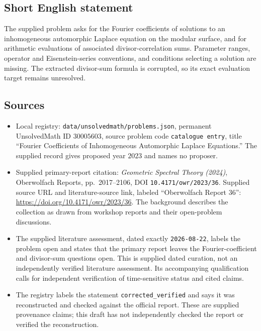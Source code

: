 \documentclass[11pt]{article}
\begin{document}
\subsection{Short English statement}
The supplied problem asks for the Fourier coefficients of solutions to an inhomogeneous automorphic Laplace equation on the modular surface, and for arithmetic evaluations of associated divisor-correlation sums. Parameter ranges, operator and Eisenstein-series conventions, and conditions selecting a solution are missing. The extracted divisor-sum formula is corrupted, so its exact evaluation target remains unresolved.
\subsection{Sources}
\begin{itemize}
\item Local registry: \texttt{data/unsolvedmath/problems.json}, permanent UnsolvedMath ID \(30005603\), source problem code \texttt{catalogue entry}, title ``Fourier Coefficients of Inhomogeneous Automorphic Laplace Equations.'' The supplied record gives proposed year \(2023\) and names no proposer.
\item Supplied primary-report citation: \emph{Geometric Spectral Theory (2024)}, Oberwolfach Reports, pp.~2017--2106, DOI \texttt{10.4171/owr/2023/36}. Supplied source URL and literature-source link, labeled ``Oberwolfach Report 36'': \url{https://doi.org/10.4171/owr/2023/36}. The background describes the collection as drawn from workshop reports and their open-problem discussions.
\item The supplied literature assessment, dated exactly \texttt{2026-08-22}, labels the problem open and states that the primary report leaves the Fourier-coefficient and divisor-sum questions open. This is supplied dated curation, not an independently verified literature assessment. Its accompanying qualification calls for independent verification of time-sensitive status and cited claims.
\item The registry labels the statement \texttt{corrected\_verified} and says it was reconstructed and checked against the official report. These are supplied provenance claims; this draft has not independently checked the report or verified the reconstruction.
\end{itemize}
\end{document}

